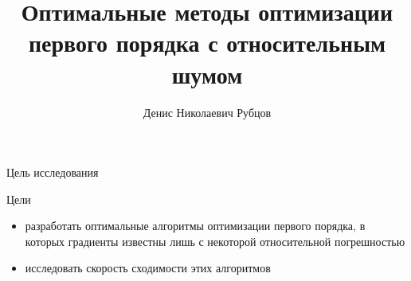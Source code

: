 \documentclass{beamer}
\title[\hbox to 56mm{Оптимальные методы оптимизации первого порядка с относительным шумом}]{Оптимальные методы оптимизации первого порядка с относительным шумом}
\author[Д.\,Н. Рубцов]{Денис Николаевич Рубцов}
\institute{Московский физико-технический институт}
\date{\footnotesize
\par\smallskip\emph{Курс:} Автоматизация научных исследований\par (практика, В.\,В.~Стрижов)/Группа 105
\par\smallskip\emph{Эксперт:} к.ф.-м.н. Э.\,А.~Горбунов
\par\smallskip\emph{Консультант:} Н.\,М.~Корнилов
\par\bigskip\small 2024}
\begin{document}
\begin{frame}
\thispagestyle{empty}
\maketitle
\end{frame}
\begin{frame}{Цель исследования}
     \begin{block}{Цели}
     \begin{itemize}
         \item разработать оптимальные алгоритмы оптимизации первого порядка, в которых градиенты известны лишь с некоторой относительной погрешностью
         \item исследовать скорость сходимости этих алгоритмов
     \end{itemize}
     \end{block}

 \end{frame}
\end{document}
